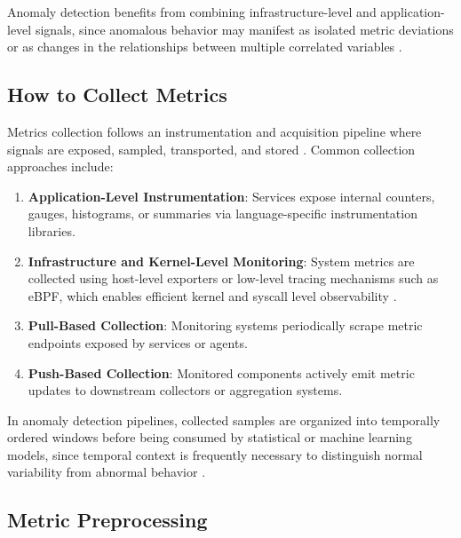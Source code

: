 Anomaly detection benefits from combining infrastructure-level and application-level
signals, since anomalous behavior may manifest as isolated metric deviations or as
changes in the relationships between multiple correlated variables \cite{sigelman2010dapper,
beyer2016site, o11y2022}.

\subsection{How to Collect Metrics}
\label{subsec:metrics_how}

Metrics collection follows an instrumentation and acquisition pipeline where signals
are exposed, sampled, transported, and stored \cite{prometheus2016, turnbull2018prometheus}.
Common collection approaches include:

\begin{enumerate}
    \item \textbf{Application-Level Instrumentation}: Services expose internal
    counters, gauges, histograms, or summaries via language-specific instrumentation
    libraries.

    \item \textbf{Infrastructure and Kernel-Level Monitoring}: System metrics are
    collected using host-level exporters or low-level tracing mechanisms such as eBPF,
    which enables efficient kernel and syscall level observability \cite{gregg2019bpf}.

    \item \textbf{Pull-Based Collection}: Monitoring systems periodically scrape metric
    endpoints exposed by services or agents.

    \item \textbf{Push-Based Collection}: Monitored components actively emit metric
    updates to downstream collectors or aggregation systems.
\end{enumerate}

In anomaly detection pipelines, collected samples are organized into temporally ordered
windows before being consumed by statistical or machine learning models, since temporal
context is frequently necessary to distinguish normal variability from abnormal behavior
\cite{malhotra2015lstm, hundman2018detecting}.

\subsection{Metric Preprocessing}
\label{subsec:metrics_preprocessing}

